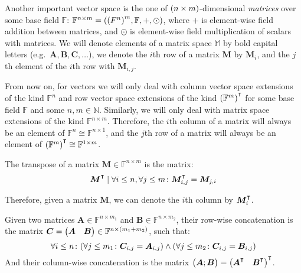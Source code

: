 Another important vector space is the one of \(\Parens*{n \times m}\)-dimensional \emph{matrices} 
over some base field \(\mathbb{F}\): 
\(\mathbb{F}^{n \times m} = \Tuple{{\Parens*{F^n}}^m, \mathbb{F}, +, \odot}\), where \(+\) is 
element-wise field addition between matrices, and \(\odot \) is element-wise field multiplication 
of scalars with matrices.
We will denote elements of a matrix space \(\mathbb{M}\) by bold capital letters 
(e.g.\  \(\bm{A}, \bm{B}, \bm{C}, \dots \)), we denote the \(i\)th row of a matrix \(\bm{M}\) by 
\(\bm{M}_{i}\), 
and the \(j\)th element of the \(i\)th row with \(\bm{M}_{i,j}\).

From now on, for vectors we will only deal with column vector space extensions of the kind 
\(\mathbb{F}^n\) and row vector space extensions of the kind 
\(\Parens*{\mathbb{F}^m}^{\transpose}\) for some base field \(\mathbb{F}\) and some 
\(n, m \in \mathbb{N}\).
Similarly, we will only deal with matrix space extensions of the kind \(\mathbb{F}^{n \times m}\).
Therefore, the \(i\)th column of a matrix will always be an element of 
\(\mathbb{F}^{n} \cong \mathbb{F}^{n \times 1}\), and the \(j\)th row of a matrix will always be an
element of \(\Parens*{\mathbb{F}^m}^{\transpose} \cong \mathbb{F}^{1 \times m}\).

\begin{definition}
  The transpose of a matrix \(\bm{M} \in \mathbb{F}^{n \times m}\) is the matrix:
  \[\bm{M}^{\transpose} \mid 
  \forall i \le n, \forall j \le m\colon \bm{M}^{\transpose}_{i,j} = \bm{M}_{j,i}\]
\end{definition}

Therefore, given a matrix \(\bm{M}\), we can denote the \(i\)th column by 
\(\bm{M}^{\transpose}_{i}\).

\begin{definition}
  Given two matrices \(\bm{A} \in \mathbb{F}^{n \times m_1}\) and 
  \(\bm{B} \in \mathbb{F}^{n \times m_2}\), their row-wise concatenation is the matrix 
  \(\bm{C} = 
  \begin{pmatrix*}
    \bm{A} & \bm{B}
  \end{pmatrix*}
    \in \mathbb{F}^{n \times \Parens*{m_1 + m_2}}\), such that:
  \[\forall i \le n\colon \Parens*{\forall j \le m_1 \colon \bm{C}_{i,j} = \bm{A}_{i,j}} \wedge 
  \Parens*{\forall j \le m_2\colon \bm{C}_{i,j} = \bm{B}_{i,j}}\]
  And their column-wise concatenation is the matrix \(
  \begin{pmatrix*}
    \bm{A}; \bm{B}
  \end{pmatrix*} =
  {\begin{pmatrix*}
    \bm{A}^{\transpose} & \bm{B}^{\transpose}
  \end{pmatrix*}}^{\transpose}
  \).
\end{definition}

